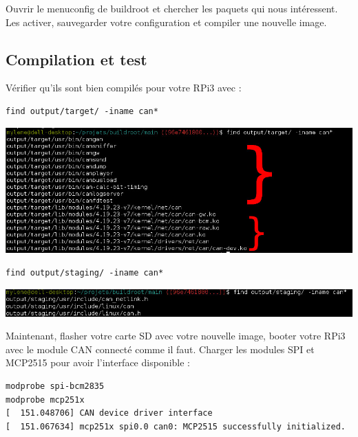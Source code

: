 Ouvrir le menuconfig de buildroot et chercher les paquets qui nous intéressent.
Les activer, sauvegarder votre configuration et compiler une nouvelle image.

\subsection{Compilation et test}

Vérifier qu'ils sont bien compilés pour votre RPi3 avec :

\begin{verbatim}
find output/target/ -iname can*
\end{verbatim}

\begin{centering}
\includegraphics[height=0.2\textheight]{pictures/04_labs/output_target.jpg} \\
\end{centering}

\begin{verbatim}
find output/staging/ -iname can*
\end{verbatim}

\begin{centering}
\includegraphics[height=0.05\textheight]{pictures/04_labs/output_staging.jpg} \\
\end{centering}

Maintenant, flasher votre carte SD avec votre nouvelle image, booter votre
RPi3 avec le module CAN connecté comme il faut.
Charger les modules SPI et MCP2515 pour avoir l'interface 
disponible :

\begin{verbatim}
modprobe spi-bcm2835
modprobe mcp251x
[  151.048706] CAN device driver interface
[  151.067634] mcp251x spi0.0 can0: MCP2515 successfully initialized.
\end{verbatim}

